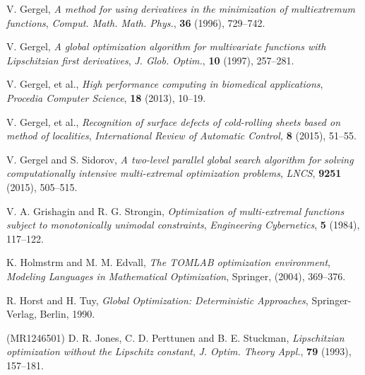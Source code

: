 \documentclass[runningheads]{llncs}
\begin{document}
\begin{thebibliography}{107}
\newblock V. Gergel,
\newblock \emph{\emph{A method for using derivatives in the minimization of multiextremum functions}},
\newblock \emph{Comput. Math. Math. Phys.}, \textbf{36} (1996), 729--742.

\newblock V. Gergel,
\newblock \emph{\emph{A global optimization algorithm for multivariate functions with Lipschitzian first derivatives}},
\newblock \emph{J. Glob. Optim.}, \textbf{10} (1997), 257--281.

\newblock V. Gergel, et al.,
\newblock \emph{\emph{High performance computing in biomedical applications}},
\newblock \emph{Procedia Computer Science}, \textbf{18} (2013), 10--19.

\newblock V. Gergel, et al.,
\newblock \emph{\emph{Recognition of surface defects of cold-rolling sheets based on method of localities}},
\newblock \emph{International Review of Automatic Control, } \textbf{8} (2015), 51--55.

\newblock V. Gergel and S. Sidorov,
\newblock \emph{\emph{A two-level parallel global search algorithm for solving computationally intensive multi-extremal optimization problems}},
\newblock \emph{LNCS}, \textbf{9251} (2015), 505--515.

\newblock V. A. Grishagin and R. G. Strongin,
\newblock \emph{\emph{Optimization of multi-extremal functions subject to monotonically unimodal constraints}},
\newblock \emph{Engineering Cybernetics}, \textbf{5} (1984), 117--122.

\newblock K. Holmstrm and M. M. Edvall,
\newblock \emph{\emph{The TOMLAB optimization environment}},
\newblock \emph{Modeling Languages in Mathematical Optimization}, Springer, (2004), 369--376.

\newblock R. Horst and H. Tuy,
\newblock \emph{Global Optimization: Deterministic Approaches},
\newblock Springer-Verlag, Berlin, 1990.

 (MR1246501)%
\newblock D. R. Jones, C. D. Perttunen and B. E. Stuckman,
\newblock \emph{\emph{Lipschitzian optimization without the Lipschitz constant}},
\newblock \emph{J. Optim. Theory Appl.}, \textbf{79} (1993), 157--181.


\end{thebibliography}
\end{document}
